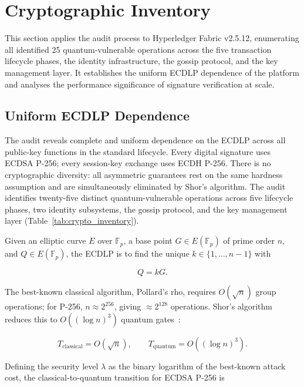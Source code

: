 \documentclass[conference]{IEEEtran}
\begin{document}
\section{Cryptographic Inventory}
\label{sec:tm_inventory}
This section applies the audit process to Hyperledger Fabric v2.5.12, enumerating all identified 25 quantum-vulnerable operations across the five transaction lifecycle phases, the identity infrastructure, the gossip protocol, and the key management layer. It establishes the uniform ECDLP dependence of the platform and analyses the performance significance of signature verification at scale.

\subsection{Uniform ECDLP Dependence}
The audit reveals complete and uniform dependence on the ECDLP across all
public-key functions in the standard lifecycle. Every digital signature uses
ECDSA P-256; every session-key exchange uses ECDH P-256. There is no
cryptographic diversity: all asymmetric guarantees rest on the same hardness
assumption and are simultaneously eliminated by Shor's algorithm. The audit
identifies twenty-five distinct quantum-vulnerable operations across five
lifecycle phases, two identity subsystems, the gossip protocol, and the key
management layer (Table~\ref{tab:crypto_inventory}).

Given an elliptic curve $E$ over $\mathbb{F}_p$, a base point
$G \in E(\mathbb{F}_p)$ of prime order $n$, and $Q \in E(\mathbb{F}_p)$, the
ECDLP is to find the unique $k \in \{1,\ldots,n-1\}$ with

\begin{equation}
Q = kG.
\label{eq:ecdlp}
\end{equation}

The best-known classical algorithm, Pollard's rho, requires $O(\sqrt{n})$ group
operations; for P-256, $n \approx 2^{256}$, giving $\approx 2^{128}$ operations.
Shor's algorithm reduces this to $O((\log n)^3)$ quantum
gates~\cite{shor1994}:

\begin{equation}
T_{\mathrm{classical}} = O\!\left(\sqrt{n}\right),
\qquad
T_{\mathrm{quantum}} = O\!\left((\log n)^3\right).
\label{eq:complexity}
\end{equation}

Defining the security level $\lambda$ as the binary logarithm of the best-known
attack cost, the classical-to-quantum transition for ECDSA P-256 is
\end{document}
